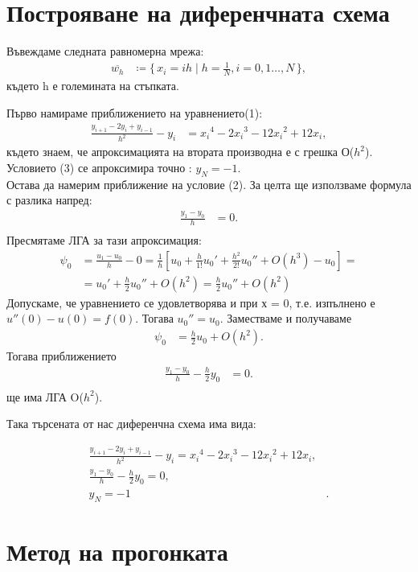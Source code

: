 \documentclass[11pt,a4paper]{article}
\newcommand\Set[2]{\{\,#1\mid#2\,\}}
\begin{document}
\pagebreak

\section{Построяване на диференчната схема}
Въвеждаме следната равномерна мрежа:
\begin{align*}
\overline{w_h} &\coloneqq  \Set{x_i  = ih }{h = \frac{1}{N}, i = 0,1\dots,N} ,
\end {align*}където h е големината на стъпката.

Първо намираме приближението на уравнението(1):
\begin{align*}
\frac{y_{i+1} - 2y_i + y_{i-1}}{h^2} - y_i &= {x_i}^4 - 2{x_i}^3 -12{x_i}^2 +12{x_i},
\end{align*}
където знаем, че апроксимацията на втората производна е с грешка О($h^2$).\\
Условието (3) се апроксимира точно : $y_N = -1$.\\
Остава да намерим приближение на условие (2). За целта ще използваме формула с разлика напред: 
\begin{align*}
\frac{y_1 - y_0}{h} &= 0.\\ 
\end{align*}
Пресмятаме ЛГА за тази апроксимация:
\begin{align*}
\psi_0 &= \frac{u_1 - u_0}{h} - 0 = \frac {1}{h}[u_0 + \frac{h}{1!}{u_0}' + \frac{h^2}{2!}{u_0}'' + O(h^3) -u_0] =\\  &={u_0}' + \frac{h}{2}{u_0}'' + O(h^2) = \frac{h}{2}{u_0}'' + O(h^2) 
\end{align*}
Допускаме, че уравнението се удовлетворява и при х = 0, т.е. изпълнено е $ u''(0) -u(0) = f(0) $. Тогава ${u_0}'' = u_0.$ Заместваме и получаваме
\begin{align*}
\psi_0 &= \frac{h}{2}{u_0} + O(h^2).
\end{align*}
Тогава приближението 
\begin{align*}
\frac{y_1 - y_0}{h} - \frac{h}{2}{y_0}  &= 0.\\ 
\end{align*}
ще има ЛГА O($h^2$).

Така търсената от нас диференчна схема има вида:

\begin{align*}
\frac{y_{i+1} - 2y_i + y_{i-1}}{h^2} - y_i = {x_i}^4 - 2{x_i}^3 -12{x_i}^2 +12{x_i},&\\
\frac{y_1 - y_0}{h} - \frac{h}{2}{y_0}  = 0,&\\
 y_N = -1&.
\end {align*}

\section{Метод на прогонката}
\end{document}
